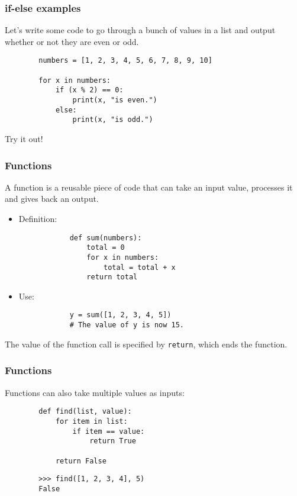 \documentclass[notes]{beamer}
\begin{document}
	\begin{frame}[fragile]
		\frametitle{if-else examples}
		
		Let's write some code to go through a bunch of values in a list and output whether or not they are even or odd.
		
		\pause
		\begin{lstlisting}
		numbers = [1, 2, 3, 4, 5, 6, 7, 8, 9, 10]
		
		for x in numbers:
		    if (x % 2) == 0:
		        print(x, "is even.")
		    else:
		        print(x, "is odd.")
		\end{lstlisting}
		\pause
		Try it out!
	\end{frame}
	
	\begin{frame}[fragile]
		\frametitle{Functions}
		A function is a reusable piece of code that can take an input value, processes it and gives back an output. \pause
		
		\begin{itemize}
			\item Definition:
			\begin{lstlisting}
			def sum(numbers):
			    total = 0
			    for x in numbers:
			        total = total + x
			    return total
			\end{lstlisting}
			\pause
			
			\item Use:
			\begin{lstlisting}
			y = sum([1, 2, 3, 4, 5])
			# The value of y is now 15.
			\end{lstlisting}
		\end{itemize}
		
		The value of the function call is specified by \lstinline|return|, which ends the function.
	\end{frame}
	
	\begin{frame}[fragile]
		\frametitle{Functions}
		Functions can also take multiple values as inputs:
		\begin{lstlisting}
		def find(list, value):
		    for item in list:
		        if item == value:
		            return True
		
		    return False
		\end{lstlisting}
		\begin{lstlisting}
		>>> find([1, 2, 3, 4], 5)
		False
		\end{lstlisting}
	\end{frame}
	
\end{document}
